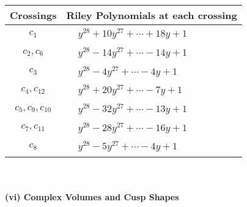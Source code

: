 \documentclass[1p]{elsarticle_modified}
\theoremstyle{definition}
\begin{document}
\begin{tabular}{m{50pt}|m{274pt}}
Crossings & \hspace{64pt}Riley Polynomials at each crossing \\
\hline $$\begin{aligned}c_{1}\end{aligned}$$&$\begin{aligned}
&y^{28}+10 y^{27}+\cdots+18 y+1
\end{aligned}$\\
\hline $$\begin{aligned}c_{2},c_{6}\end{aligned}$$&$\begin{aligned}
&y^{28}-14 y^{27}+\cdots-14 y+1
\end{aligned}$\\
\hline $$\begin{aligned}c_{3}\end{aligned}$$&$\begin{aligned}
&y^{28}-4 y^{27}+\cdots-4 y+1
\end{aligned}$\\
\hline $$\begin{aligned}c_{4},c_{12}\end{aligned}$$&$\begin{aligned}
&y^{28}+20 y^{27}+\cdots-7 y+1
\end{aligned}$\\
\hline $$\begin{aligned}c_{5},c_{9},c_{10}\end{aligned}$$&$\begin{aligned}
&y^{28}-32 y^{27}+\cdots-13 y+1
\end{aligned}$\\
\hline $$\begin{aligned}c_{7},c_{11}\end{aligned}$$&$\begin{aligned}
&y^{28}-28 y^{27}+\cdots-16 y+1
\end{aligned}$\\
\hline $$\begin{aligned}c_{8}\end{aligned}$$&$\begin{aligned}
&y^{28}-5 y^{27}+\cdots-4 y+1
\end{aligned}$\\
\hline
\end{tabular}\\~\\
\newpage\flushleft \textbf{(vi) Complex Volumes and Cusp Shapes}
\end{document}
